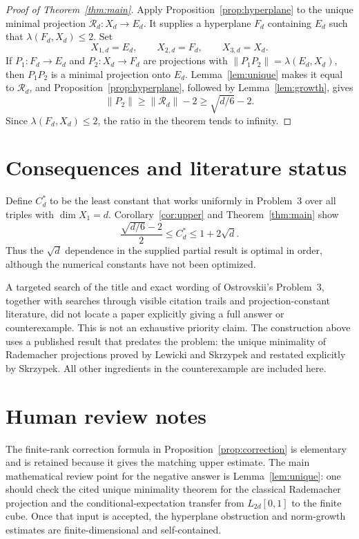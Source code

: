 \documentclass[11pt]{article}
\theoremstyle{remark}
\begin{document}
\begin{proof}[Proof of Theorem~\ref{thm:main}]
Apply Proposition~\ref{prop:hyperplane} to the unique minimal projection
$\mathcal R_d:X_d\to E_d$.  It supplies a hyperplane $F_d$ containing
$E_d$ such that $\lambda(F_d,X_d)\leq2$.  Set
\[
       X_{1,d}=E_d,\qquad X_{2,d}=F_d,\qquad X_{3,d}=X_d.
\]
If $P_1:F_d\to E_d$ and $P_2:X_d\to F_d$ are projections with
$\|P_1P_2\|=\lambda(E_d,X_d)$, then $P_1P_2$ is a minimal projection onto
$E_d$.  Lemma~\ref{lem:unique} makes it equal to $\mathcal R_d$, and
Proposition~\ref{prop:hyperplane}, followed by Lemma~\ref{lem:growth}, gives
\[
       \|P_2\|\geq\|\mathcal R_d\|-2
                 \geq\sqrt{d/6}-2.
\]
Since $\lambda(F_d,X_d)\leq2$, the ratio in the theorem tends to infinity.
\end{proof}

\section{Consequences and literature status}

Define $C_d^*$ to be the least constant that works uniformly in Problem~3 over
all triples with $\dim X_1=d$.  Corollary~\ref{cor:upper} and
Theorem~\ref{thm:main} show
\[
 \frac{\sqrt{d/6}-2}{2}\leq C_d^*\leq1+2\sqrt d.
\]
Thus the $\sqrt d$ dependence in the supplied partial result is optimal in
order, although the numerical constants have not been optimized.

A targeted search of the title and exact wording of Ostrovskii's Problem~3,
together with searches through visible citation trails and projection-constant
literature, did not locate a paper explicitly giving a full answer or
counterexample.  This is not an exhaustive priority claim.  The construction
above uses a published result that predates the problem: the unique minimality
of Rademacher projections proved by Lewicki and Skrzypek and restated explicitly
by Skrzypek.  All other ingredients in the counterexample are included here.

\section*{Human review notes}

The finite-rank correction formula in Proposition~\ref{prop:correction} is
elementary and is retained because it gives the matching upper estimate.  The
main mathematical review point for the negative answer is
Lemma~\ref{lem:unique}: one should check the cited unique minimality theorem
for the classical Rademacher projection and the conditional-expectation
transfer from $L_{2d}[0,1]$ to the finite cube.  Once that input is accepted,
the hyperplane obstruction and norm-growth estimates are finite-dimensional
and self-contained.
\end{document}
